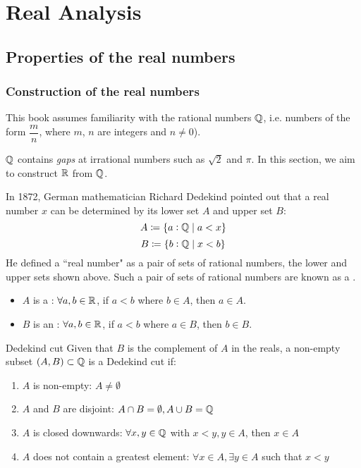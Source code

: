 \part{Real Analysis}
\chapter{Properties of the real numbers}
\section{Construction of the real numbers}
This book assumes familiarity with the rational numbers $\mathbb Q$, i.e. numbers of the form $\dfrac{m}{n}$, where $m$, $n$ are integers and $n \neq 0$). 

$\mathbb Q$ contains \emph{gaps} at irrational numbers such as $\sqrt{2}$ and $\pi$. In this section, we aim to construct $\mathbb R$ from $\mathbb Q$.

In 1872, German mathematician Richard Dedekind pointed out that a real number $x$ can be determined by its lower set $A$ and upper set $B$:
\[ A \coloneqq \{a:\mathbb Q \mid a<x\} \]
\[ B \coloneqq \{b:\mathbb Q \mid x<b\} \]
He defined a ``real number" as a pair of sets of rational numbers, the lower and upper sets shown above. Such a pair of sets of rational numbers are known as a .

\begin{itemize}
\item $A$ is a : $\forall a, b \in \mathbb R$, if $a<b$ where $b \in A$, then $a \in A$.
\item $B$ is an : $\forall a, b \in \mathbb R$, if $a<b$ where $a \in B$, then $b \in B$.
\end{itemize}

\begin{defn}{Dedekind cut}{}
Given that $B$ is the complement of $A$ in the reals, a non-empty subset $(A, B) \subset \mathbb Q$ is a Dedekind cut if:
\begin{enumerate}[label=\textbf{D\arabic*}]
\item $A$ is non-empty: $A \neq \emptyset$
\item $A$ and $B$ are disjoint: $A \cap B = \emptyset, A \cup B = \mathbb Q$
\item $A$ is closed downwards: $\forall x,y \in \mathbb Q$ with $x<y, y \in A$, then $x \in A$
\item $A$ does not contain a greatest element: $\forall x \in A, \exists y \in A$ such that $x<y$
\end{enumerate}
\end{defn}

